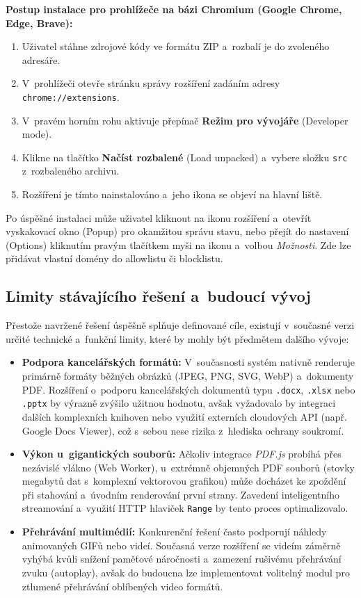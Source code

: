 \documentclass[a4paper,12pt]{article}
\begin{document}
\noindent\textbf{Postup instalace pro prohlížeče na bázi Chromium (Google Chrome, Edge, Brave):}
\begin{enumerate}
    \item Uživatel stáhne zdrojové kódy ve formátu ZIP a~rozbalí je do zvoleného adresáře.
    \item V~prohlížeči otevře stránku správy rozšíření zadáním adresy \texttt{chrome://extensions}.
    \item V~pravém horním rohu aktivuje přepínač \textbf{Režim pro vývojáře} (Developer mode).
    \item Klikne na tlačítko \textbf{Načíst rozbalené} (Load unpacked) a~vybere složku \texttt{src} z~rozbaleného archivu.
    \item Rozšíření je tímto nainstalováno a~jeho ikona se objeví na hlavní liště.
\end{enumerate}

Po úspěšné instalaci může uživatel kliknout na ikonu rozšíření a~otevřít vyskakovací okno (Popup) pro okamžitou správu stavu, nebo přejít do nastavení (Options) kliknutím pravým tlačítkem myši na ikonu a~volbou \textit{Možnosti}. Zde lze přidávat vlastní domény do allowlistu či blocklistu.

\subsection{Limity stávajícího řešení a~budoucí vývoj}
\label{subsec:praxe_limity}

Přestože navržené řešení úspěšně splňuje definované cíle, existují v~současné verzi určité technické a~funkční limity, které by mohly být předmětem dalšího vývoje:

\begin{itemize}
    \item \textbf{Podpora kancelářských formátů:} V~současnosti systém nativně renderuje primárně formáty běžných obrázků (JPEG, PNG, SVG, WebP) a~dokumenty PDF. Rozšíření o~podporu kancelářských dokumentů typu \texttt{.docx}, \texttt{.xlsx} nebo \texttt{.pptx} by výrazně zvýšilo užitnou hodnotu, avšak vyžadovalo by integraci dalších komplexních knihoven nebo využití externích cloudových API (např. Google Docs Viewer), což s~sebou nese rizika z~hlediska ochrany soukromí.
    \item \textbf{Výkon u~gigantických souborů:} Ačkoliv integrace \textit{PDF.js} probíhá přes nezávislé vlákno (Web Worker), u~extrémně objemných PDF souborů (stovky megabytů dat s~komplexní vektorovou grafikou) může docházet ke zpoždění při stahování a~úvodním renderování první strany. Zavedení inteligentního streamování a~využití HTTP hlaviček \texttt{Range} by tento proces optimalizovalo.
    \item \textbf{Přehrávání multimédií:} Konkurenční řešení často podporují náhledy animovaných GIFů nebo videí. Současná verze rozšíření se videím záměrně vyhýbá kvůli snížení paměťové náročnosti a~zamezení rušivému přehrávání zvuku (autoplay), avšak do budoucna lze implementovat volitelný modul pro ztlumené přehrávání oblíbených video formátů.
\end{itemize}
\end{document}
